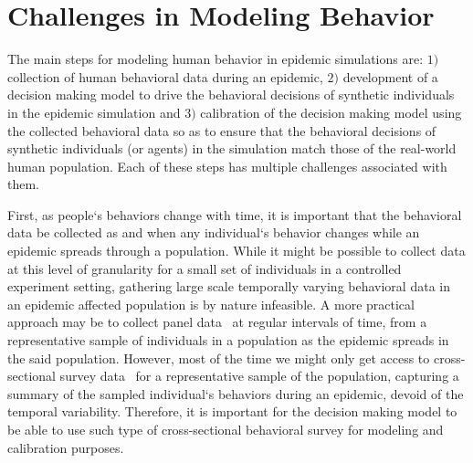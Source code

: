 \documentclass[doublespace]{VTthesis}
\begin{document}
    \section{Challenges in Modeling Behavior}
    The main steps for modeling human behavior in epidemic simulations are: $1)$ collection of human behavioral data during an epidemic, $2)$ development of a decision making model to drive the behavioral decisions of synthetic individuals in the epidemic simulation and $3)$ calibration of the decision making model using the collected behavioral data so as to ensure that the behavioral decisions of synthetic individuals (or agents) in the simulation match those of the real-world human population. Each of these steps has multiple challenges associated with them. 
    
    First, as people`s behaviors change with time, it is important that the behavioral data be collected as and when any individual`s behavior changes while an epidemic spreads through a population. While it might be possible to collect data at this level of granularity for a small set of individuals in a controlled experiment setting, gathering large scale temporally varying behavioral data in an epidemic affected population is by nature infeasible. A more practical approach may be to collect panel data~\cite{diggle2002analysis,fitzmaurice2012applied} at regular intervals of time, from a representative sample of individuals in a population as the epidemic spreads in the said population. However, most of the time we might only get access to cross-sectional survey data~\cite{barnett2012epidemiology,johnson1988job} for a representative sample of the population, capturing a summary of the sampled individual`s behaviors during an epidemic, devoid of the temporal variability. Therefore, it is important for the decision making model to be able to use such type of cross-sectional behavioral survey for modeling and calibration purposes. 
    
\end{document}
